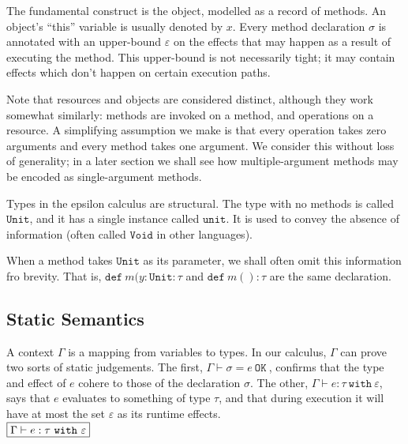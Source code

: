 \documentclass[a4paper,UKenglish]{lipics-v2016}
\newcommand{\kw}[1]{\mathtt{ #1 }~}
\newcommand{\kwa}[1]{\mathtt{ #1 }}
\begin{document}
\noindent
 The fundamental construct is the object, modelled as a record of methods. An object's ``this'' variable is usually denoted by $x$. Every method declaration $\sigma$ is annotated with an upper-bound $\varepsilon$ on the effects that may happen as a result of executing the method. This upper-bound is not necessarily tight; it may contain effects which don't happen on certain execution paths.
 
Note that resources and objects are considered distinct, although they work somewhat similarly: methods are invoked on a method, and operations on a resource. A simplifying assumption we make is that every operation takes zero arguments and every method takes one argument. We consider this without loss of generality; in a later section we shall see how multiple-argument methods may be encoded as single-argument methods.

Types in the epsilon calculus are structural. The type with no methods is called $\kwa{Unit}$, and it has a single instance called $\kwa{unit}$. It is used to convey the absence of information (often called $\kwa{Void}$ in other languages).

When a method takes $\kwa{Unit}$ as its parameter, we shall often omit this information fro brevity. That is, $\kw{def} m(y: \kwa{Unit}: \tau$ and $\kw{def} m(): \tau$ are the same declaration.

\subsection{Static Semantics}

A context $\Gamma$ is a mapping from variables to types. In our calculus, $\Gamma$ can prove two sorts of static judgements. The first, $\Gamma \vdash \sigma = e~\kw{OK}$, confirms that the type and effect of $e$ cohere to those of the declaration $\sigma$. The other, $\Gamma \vdash e: \tau~\kw{with} \varepsilon$, says that $e$ evaluates to something of type $\tau$, and that during execution it will have at most the set $\varepsilon$ as its runtime effects.\\

\noindent
$\fbox{$\Gamma \vdash e: \tau~\kw{with} \varepsilon$}$
\end{document}
